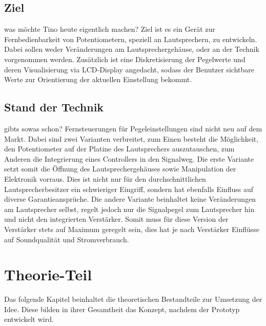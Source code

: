 \documentclass[11pt, titlepage, fleqn]{report}
\begin{document}
	\section{Ziel}
		was möchte Tino heute eigentlich machen?\newline
		Ziel ist es ein Gerät zur Fernbedienbarkeit von Potentiometern, speziell an Lautsprechern, zu entwickeln. Dabei sollen weder Veränderungen am Lautsprechergehäuse, oder an der Technik vorgenommen werden. Zusätzlich ist eine Diskretisierung der Pegelwerte und deren Visualisierung via LCD-Display angedacht, sodass der Benutzer sichtbare 
		Werte zur Orientierung der aktuellen Einstellung bekommt. 
	\section{Stand der Technik}	
		gibts sowas schon?\newline
		Fernsteuerungen für Pegeleinstellungen sind nicht neu auf dem Markt. Dabei sind zwei Varianten verbreitet, zum Einen besteht die Möglichkeit, den Potentiometer auf der Platine des Lautsprechers auszutauschen, zum Anderen die Integrierung eines Controllers in den Signalweg. Die erste Variante setzt somit die Öffnung des Lautsprechergehäuses sowie Manipulation der Elektronik vorraus. Dies ist nicht nur für den durchschnittlichen
		Lautsprecherbesitzer ein schwieriger Eingriff, sondern hat ebenfalls Einfluss auf diverse Garantieansprüche.\newline
		Die andere Variante beinhaltet keine Veränderungen am Lautsprecher selbst, regelt jedoch nur die Signalpegel zum Lautsprecher hin und nicht den integrierten Verstärker. Somit muss für diese Version der Verstärker stets auf Maximum geregelt sein, dies hat je nach Verstärker Einflüsse auf Soundqualität und Stromverbrauch.
	\chapter{Theorie-Teil}
		Das folgende Kapitel beinhaltet die theoretischen Bestandteile zur Umsetzung der Idee. Diese bilden in ihrer Gesamtheit das Konzept,
		nachdem der Prototyp entwickelt wird.
\end{document}
